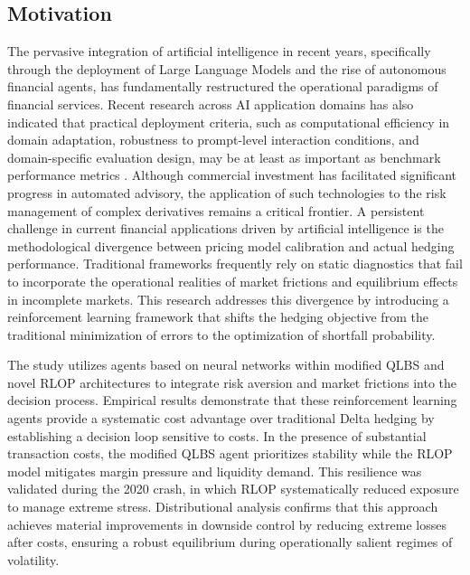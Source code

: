 
\subsection{Motivation}
The pervasive integration of artificial intelligence in recent years, specifically through the deployment of Large Language Models and the rise of autonomous financial agents, has fundamentally restructured the operational paradigms of financial services. Recent research across AI application domains has also indicated that practical deployment criteria, such as computational efficiency in domain adaptation, robustness to prompt-level interaction conditions, and domain-specific evaluation design, may be at least as important as benchmark performance metrics \cite{codes2026,cai2026tone}. Although commercial investment has facilitated significant progress in automated advisory, the application of such technologies to the risk management of complex derivatives remains a critical frontier. A persistent challenge in current financial applications driven by artificial intelligence is the methodological divergence between pricing model calibration and actual hedging performance. Traditional frameworks frequently rely on static diagnostics that fail to incorporate the operational realities of market frictions and equilibrium effects in incomplete markets. This research addresses this divergence by introducing a reinforcement learning framework that shifts the hedging objective from the traditional minimization of errors to the optimization of shortfall probability.

The study utilizes agents based on neural networks within modified QLBS and novel RLOP architectures to integrate risk aversion and market frictions into the decision process. Empirical results demonstrate that these reinforcement learning agents provide a systematic cost advantage over traditional Delta hedging by establishing a decision loop sensitive to costs. In the presence of substantial transaction costs, the modified QLBS agent prioritizes stability while the RLOP model mitigates margin pressure and liquidity demand. This resilience was validated during the 2020 crash, in which RLOP systematically reduced exposure to manage extreme stress. Distributional analysis confirms that this approach achieves material improvements in downside control by reducing extreme losses after costs, ensuring a robust equilibrium during operationally salient regimes of volatility.

